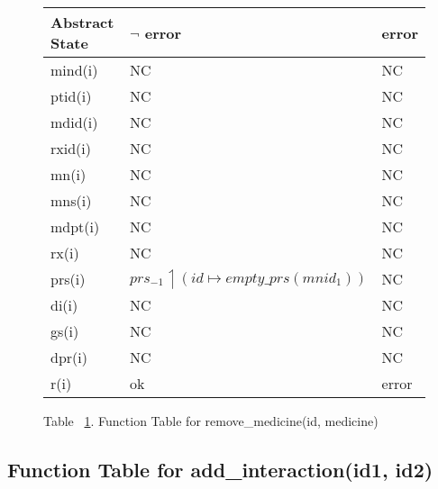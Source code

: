 \begin{figure}[h]
\begin{center}
\begin{tabular}{|l|l|l|}
\hline
Abstract State & $\neg$ error & error \\ \hline
mind(i)        &    NC       & NC    \\ \hline
ptid(i)        &      NC     & NC    \\ \hline
mdid(i)        &    NC       & NC    \\ \hline
rxid(i)        &      NC     & NC    \\ \hline
mn(i)          &     NC      & NC    \\ \hline
mns(i)         &    NC       & NC    \\ \hline
mdpt(i)        &    NC       & NC    \\ \hline
rx(i)          &       NC    & NC    \\ \hline
prs(i)         &      $prs_{-1} \upharpoonleft (id \mapsto empty\_prs(mnid_{1}))$     & NC    \\ \hline
di(i)          &       NC   & NC    \\ \hline
gs(i)          &      NC     & NC    \\ \hline
dpr(i)         &      NC     & NC    \\ \hline
r(i)           & ok        & error \\ \hline
\end{tabular}
\caption{Table ~\ref{ft-rm}. Function Table for remove\_medicine(id, medicine)}
\label{ft-rm}
\end{center}
\end{figure}

\newpage

\subsection{Function Table for add\_interaction(id1, id2)}

